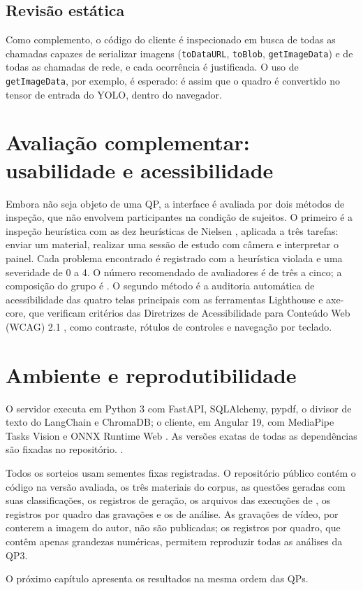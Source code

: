 \subsection{Revisão estática}

Como complemento, o código do cliente é inspecionado em busca de todas as chamadas capazes de serializar imagens (\texttt{toDataURL}, \texttt{toBlob}, \texttt{getImageData}) e de todas as chamadas de rede, e cada ocorrência é justificada. O uso de \texttt{getImageData}, por exemplo, é esperado: é assim que o quadro é convertido no tensor de entrada do YOLO, dentro do navegador.

\section{\label{sec:met-usab}Avaliação complementar: usabilidade e acessibilidade}

Embora não seja objeto de uma QP, a interface é avaliada por dois métodos de inspeção, que não envolvem participantes na condição de sujeitos. O primeiro é a inspeção heurística com as dez heurísticas de Nielsen \cite{Nie94}, aplicada a três tarefas: enviar um material, realizar uma sessão de estudo com câmera e interpretar o painel. Cada problema encontrado é registrado com a heurística violada e uma severidade de 0 a 4. O número recomendado de avaliadores é de três a cinco; a composição do grupo é . O segundo método é a auditoria automática de acessibilidade das quatro telas principais com as ferramentas Lighthouse e axe-core, que verificam critérios das Diretrizes de Acessibilidade para Conteúdo Web (WCAG) 2.1 \cite{W3C18}, como contraste, rótulos de controles e navegação por teclado.

\section{\label{sec:reprod}Ambiente e reprodutibilidade}

O servidor executa em Python 3 com FastAPI, SQLAlchemy, pypdf, o divisor de texto do LangChain e ChromaDB; o cliente, em Angular 19, com MediaPipe Tasks Vision e ONNX Runtime Web . As versões exatas de todas as dependências são fixadas no repositório. .

Todos os sorteios usam sementes fixas registradas. O repositório público  contém o código na versão avaliada, os três materiais do corpus, as questões geradas com suas classificações, os registros de geração, os arquivos das execuções de , os registros por quadro das gravações e os  de análise. As gravações de vídeo, por conterem a imagem do autor, não são publicadas; os registros por quadro, que contêm apenas grandezas numéricas, permitem reproduzir todas as análises da QP3.

O próximo capítulo apresenta os resultados na mesma ordem das QPs.
